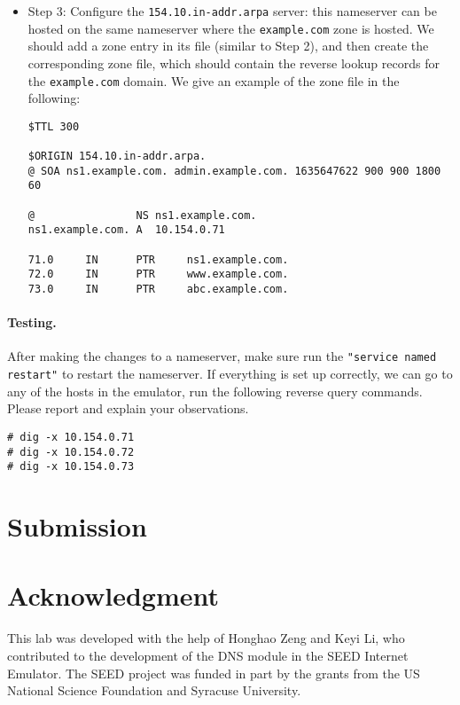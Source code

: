 \begin{itemize}
    

\item Step 3: Configure the \texttt{154.10.in-addr.arpa} server: 
this nameserver can be hosted on the same nameserver
where the \texttt{example.com} zone is hosted.
We should add a zone entry in its 
 file (similar to Step 2), and then
create the corresponding zone file, which should 
contain the reverse lookup records for the \texttt{example.com} domain.
We give an example of the zone file in the following:
    
\begin{lstlisting}
$TTL 300

$ORIGIN 154.10.in-addr.arpa.
@ SOA ns1.example.com. admin.example.com. 1635647622 900 900 1800 60

@                NS ns1.example.com.
ns1.example.com. A  10.154.0.71

71.0     IN      PTR     ns1.example.com.
72.0     IN      PTR     www.example.com.
73.0     IN      PTR     abc.example.com.
\end{lstlisting}
     
\end{itemize}



\paragraph{Testing.}  After making the changes to a nameserver, make sure 
run the \texttt{"service named restart"} to restart the nameserver. If everything
is set up correctly, we can go to any of the hosts in the emulator, 
run the following reverse query commands. Please report and explain 
your observations. 

\begin{lstlisting}
# dig -x 10.154.0.71
# dig -x 10.154.0.72
# dig -x 10.154.0.73
\end{lstlisting}
 




\section{Submission}





\section*{Acknowledgment} 

This lab was developed with the help of Honghao Zeng and Keyi Li, who
contributed to the development of the DNS module in the SEED 
Internet Emulator. The SEED project was funded in part 
by the grants from the US National Science Foundation
and Syracuse University.




